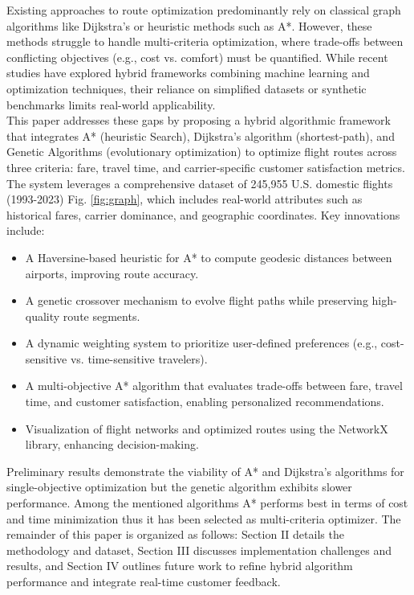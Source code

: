 \documentclass[conference]{IEEEtran}
\begin{document}
Existing approaches to route optimization predominantly rely on classical graph algorithms like Dijkstra's or heuristic methods such as A*. 
However, these methods struggle to handle multi-criteria optimization, where trade-offs between conflicting objectives (e.g., cost vs. comfort) must be quantified. 
While recent studies have explored hybrid frameworks combining machine learning and optimization techniques, their reliance on simplified datasets or synthetic benchmarks limits real-world applicability.\\

This paper addresses these gaps by proposing a hybrid algorithmic framework that integrates A* (heuristic Search), Dijkstra's algorithm (shortest-path), and Genetic Algorithms (evolutionary optimization) to optimize flight routes across three criteria: fare, travel time, and carrier-specific customer satisfaction metrics. 
The system leverages a comprehensive dataset of 245,955 U.S. domestic flights (1993-2023) Fig. \ref{fig:graph}, which includes real-world attributes such as historical fares, carrier dominance, and geographic coordinates. 
Key innovations include:
\begin{itemize}
    \item A Haversine-based heuristic for A* to compute geodesic distances between airports, improving route accuracy.
    \item A genetic crossover mechanism to evolve flight paths while preserving high-quality route segments.
    \item A dynamic weighting system to prioritize user-defined preferences (e.g., cost-sensitive vs. time-sensitive travelers).
    \item A multi-objective A* algorithm that evaluates trade-offs between fare, travel time, and customer satisfaction, enabling personalized recommendations.
    \item Visualization of flight networks and optimized routes using the NetworkX library, enhancing decision-making.
\end{itemize}
Preliminary results demonstrate the viability of A* and Dijkstra's algorithms for single-objective optimization but the genetic algorithm exhibits slower performance. 
Among the mentioned algorithms A* performs best in terms of cost and time minimization thus it has been selected as multi-criteria optimizer. 
The remainder of this paper is organized as follows: Section II details the methodology and dataset, Section III discusses implementation challenges and results, and Section IV outlines future work to refine hybrid algorithm performance and integrate real-time customer feedback.
\end{document}
